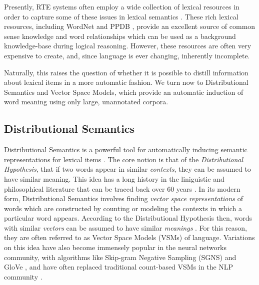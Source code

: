 \documentclass[12pt]{article}
\begin{document}
Presently, RTE systems often employ a wide collection of lexical resources in
order to capture some of these issues in lexical semantics
\cite{maccartney:2008:coling,bjerva:2014:semeval,beltagy:2016:cl}. These
rich lexical resources, including WordNet \cite{miller:1995:acm} and PPDB
\cite{ganitkevitch:2013:naacl}, provide an excellent
source of common sense knowledge and word relationships which can be used as a
background knowledge-base during logical reasoning. However, these resources
are often very expensive to create, and, since language is ever changing,
inherently incomplete.

Naturally, this raises the question of whether it is possible to distill
information about lexical items in a more automatic fashion. We turn now to
Distributional Semantics and Vector Space Models, which provide an automatic
induction of word meaning using only large, unannotated corpora.

\subsection{Distributional Semantics}
\label{sec:dist}

Distributional Semantics is a powerful tool for automatically inducing semantic
representations for lexical items \cite{turney:2010:jair,erk:2012:llc}.  The
core notion is that of the {\em Distributional Hypothesis}, that if two words
appear in similar {\em contexts}, they can be assumed to have similar meaning.
This idea has a long history in the liniguistic and philosophical literature that
can be traced back over 60 years
\cite{wittgenstein:1953:pi,harris:1954:word,firth:1957:la}. In its modern form,
Distributional Semantics involves finding {\em vector space representations} of
words which are constructed by counting or modeling the contexts in which a
particular word appears. According to the Distributional Hypothesis then, words
with similar {\em vectors} can be assumed to have similar {\em meanings}
\cite{turney:2010:jair}. For this reason, they are often referred to as
Vector Space Models (VSMs) of language. Variations on this idea have also
become immensely popular in the neural networks community, with algorithms
like Skip-gram Negative Sampling (SGNS) \cite{mikolov:2013:iclr} and GloVe
\cite{pennington:2014:emnlp}, and have often replaced traditional count-based
VSMs in the NLP community \cite{baroni:2014:acl}.
\end{document}
